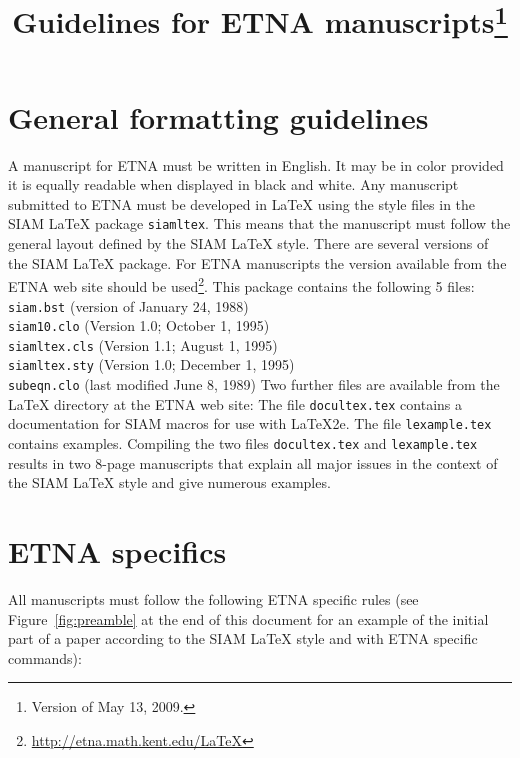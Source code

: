 \documentclass{scrartcl}
\title{Guidelines for ETNA manuscripts\footnote{Version of May 13, 2009.}}
\date{}
\begin{document}
\maketitle

\section{General formatting guidelines}

A manuscript for ETNA must be written in English. It may be in color provided
it is equally readable when displayed in black and white.
\bigskip
%
Any manuscript submitted to ETNA must be developed in {\LaTeX} using the style
files in the SIAM {\LaTeX} package \texttt{siamltex}.  This means that the
manuscript must follow the general layout defined by the SIAM {\LaTeX} style.
\bigskip
%
There are several versions of the SIAM {\LaTeX} package. For ETNA manuscripts
the version available from the ETNA web site should be
used\footnote{\url{http://etna.math.kent.edu/LaTeX}}. This package contains the
following 5 files:
\bigskip
%
\noindent \texttt{siam.bst} (version of January 24, 1988)\\
\texttt{siam10.clo} (Version 1.0; October 1, 1995)\\
\texttt{siamltex.cls} (Version 1.1; August 1, 1995)\\
\texttt{siamltex.sty} (Version 1.0; December 1, 1995)\\
\texttt{subeqn.clo} (last modified June 8, 1989)
\bigskip
%
Two further files are available from the {\LaTeX} directory at the ETNA web
site: The file \texttt{docultex.tex} contains a documentation for SIAM macros
for use with {\LaTeX}2e. The file \texttt{lexample.tex} contains examples.
\bigskip
%
Compiling the two files \texttt{docultex.tex} and \texttt{lexample.tex} results
in two 8-page manuscripts that explain all major issues in the context of the
SIAM {\LaTeX} style and give numerous examples.



\section{ETNA specifics}
All manuscripts must follow the following ETNA specific rules (see
Figure~\ref{fig:preamble} at the end of this document for an example of the
initial part of a paper according to the SIAM {\LaTeX} style and with ETNA
specific commands):
\end{document}
